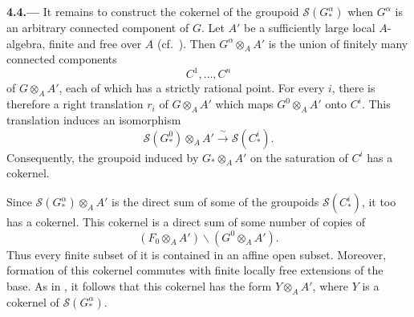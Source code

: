 
\medskip
{}\label{par:sga3-VIA-4.4}%
\noindent\textbf{4.4.---}
It remains to construct the cokernel of the groupoid
\(\mathscr S(G^\alpha_*)\) when \(G^\alpha\) is an arbitrary
connected component of \(G\). Let \(A'\) be a sufficiently large
local \(A\)-algebra, finite and free over \(A\) (cf.\ ). Then
\(G^\alpha\otimes_AA'\) is the union of finitely many connected
components
\[
  C^1,\ldots,C^n
\]
of \(G\otimes_AA'\), each of which has a strictly rational point.
For every \(i\), there is therefore a right translation \(r_i\) of
\(G\otimes_AA'\) which maps \(G^0\otimes_AA'\) onto \(C^i\).
This translation induces an isomorphism
\[
  \mathscr S(G^0_*)\otimes_AA'
    \xrightarrow{\ \sim\ }
  \mathscr S(C^i_*).
\]
Consequently, the groupoid induced by \(G_*\otimes_AA'\) on the
saturation of \(C^i\) has a cokernel.

Since \(\mathscr S(G^\alpha_*)\otimes_AA'\) is the direct sum of
some of the groupoids \(\mathscr S(C^i_*)\), it too has a cokernel.
This cokernel is a direct sum of some number of copies of
\[
  (F_0\otimes_AA')\backslash(G^0\otimes_AA').
\]
Thus every finite subset of it is contained in an affine open subset.
Moreover, formation of this cokernel commutes with finite locally
free extensions of the base. As in , it follows
that this cokernel has the form \(Y\otimes_AA'\), where \(Y\) is a
cokernel of \(\mathscr S(G^\alpha_*)\).

